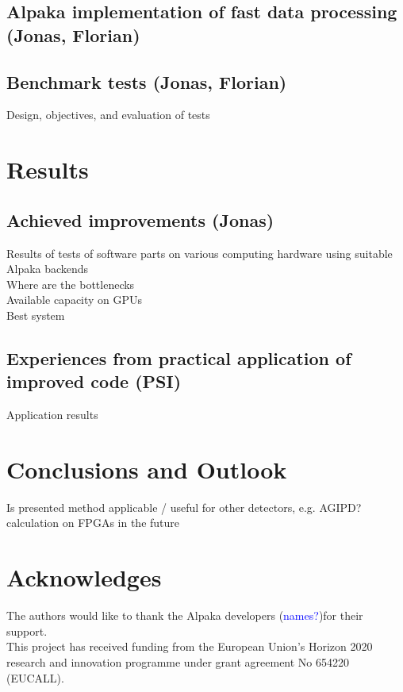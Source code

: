 \documentclass[a4paper]{article}
\begin{document}
\subsection{Alpaka implementation of fast data processing (Jonas, Florian)}
\label{subsec:alpaka}

\subsection{Benchmark tests (Jonas, Florian)}
\label{subsec:benchmark}
Design, objectives, and evaluation of tests

\section{Results}
\label{sec:results}
\subsection{Achieved improvements (Jonas)}
Results of tests of software parts on various computing hardware using suitable Alpaka backends\\

Where are the bottlenecks\\

Available capacity on GPUs\\

Best system

\subsection{Experiences from practical application of improved code (PSI)}
Application results

\section{Conclusions and Outlook}
\label{sec:conclusions}
Is presented method applicable / useful for other detectors, e.g. AGIPD? \\

calculation on FPGAs in the future


\section{Acknowledges}
The authors would like to thank  the Alpaka developers (\textcolor{blue}{names?})for their support.\\

This project has received funding from the European Union's Horizon 2020 research and innovation programme under grant agreement No 654220 (EUCALL).

\newpage

\begin{sloppypar}
\printbibliography
\end{sloppypar}
\end{document}
